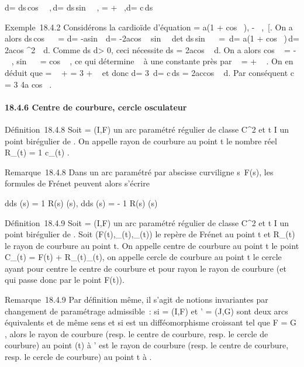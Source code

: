 \documentclass[]{article}
\begin{document}
d\rho = ds\,cos~
\alpha~,\quad \rho\,d\theta =
ds\,sin~ \alpha~, \phi = \theta +
\alpha~,\quad d\phi = c\,ds

Exemple~18.4.2 Considérons la cardioïde d'équation \rho = a(1
+ cos~ \theta), \theta \in{]} - \pi~,\pi~{[}. On a alors
ds\,cos~ \alpha~ = d\rho =
-asin~ \theta\,d\theta =
-2acos  \theta {}~
 sin  \theta {}~
\,d\theta et ds\,sin~
\alpha~ = \rho\,d\theta = a(1 + cos~
\theta)\,d\theta = 2acos ^2~
\theta {} \,d\theta. Comme  ds
\over d\theta \textgreater{} 0, ceci nécessite ds =
2acos  \theta {}~ d\theta. On a
alors cos \alpha~ = -\sin~
 \theta {} , sin~ \alpha~
= cos  \theta {}~ , ce qui
détermine \alpha~ à une constante près par \alpha~ = \theta {}
+ \pi~  . On en déduit que \phi = \alpha~ + \theta = 3\theta
{} + \pi~  et donc d\phi = 3
 \,d\theta = c\,ds =
2accos  \theta {}~ d\theta. Par
conséquent c = 3 \over 4a cos~
 \theta {}  .

\paragraph{18.4.6 Centre de courbure, cercle osculateur}

Définition~18.4.8 Soit \Gamma = (I,F) un arc paramétré régulier de classe
C^2 et t \in I un point birégulier de \Gamma. On appelle rayon de
courbure au point t le nombre réel R\_\Gamma(t) = 1
\over c\_\Gamma(t) .

Remarque~18.4.8 Dans un arc paramétré par abscisse curviligne
s\mapsto~F(s), les formules de Frénet peuvent alors
s'écrire

 d\vect \over ds (s) = 1
\over R(s) \vecn(s),
d\vecn \over ds (s) = - 1
\over R(s) \vect(s)

Définition~18.4.9 Soit \Gamma = (I,F) un arc paramétré régulier de classe
C^2 et t \in I un point birégulier de \Gamma. Soit
(F(t),\vect\_\Gamma(t),\vecn\_\Gamma(t))
le repère de Frénet au point t et R\_\Gamma(t) le rayon de courbure
au point t. On appelle centre de courbure au point t le point
C\_\Gamma(t) = F(t) +
R\_\Gamma(t)\vecn\_\Gamma(t), on appelle cercle
de courbure au point t le cercle ayant pour centre le centre de courbure
et pour rayon le rayon de courbure (et qui passe donc par le point
F(t)).

Remarque~18.4.9 Par définition même, il s'agit de notions invariantes
par changement de paramétrage admissible~: si \Gamma = (I,F) et \Gamma' = (J,G)
sont deux arcs équivalents et de même sens et si \theta est un
difféomorphisme croissant tel que F = G \cdot \theta, alors le rayon de courbure
(resp. le centre de courbure, resp. le cercle de courbure) au point \theta(t)
à \Gamma' est le rayon de courbure (resp. le centre de courbure, resp. le
cercle de courbure) au point t à \Gamma.
\end{document}
